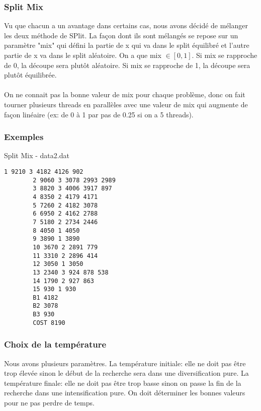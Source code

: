 \documentclass{beamer}
\begin{document}
\begin{frame}
    \frametitle{Split Mix}
    Vu que chacun a un avantage dans certains cas, nous avons décidé de mélanger les deux méthode de SPlit. La façon dont ils sont mélangés se repose sur un paramètre "mix" qui défini la partie de x qui va dans le split équilibré et l'autre partie de x va dans le split aléatoire.
    On a que mix $\in [0,1]$. Si mix se rapproche de 0, la découpe sera plutôt aléatoire. Si mix se rapproche de 1, la découpe sera plutôt équilibrée. \\~\\

    On ne connait pas la bonne valeur de mix pour chaque problème, donc on fait tourner plusieurs threads en parallèles avec une valeur de mix qui augmente de façon linéaire (ex: de 0 à 1 par pas de 0.25 si on a 5 threads).
\end{frame}

\begin{frame}[fragile]
    \frametitle{Exemples}
    \begin{exampleblock}{Split Mix - data2.dat}
        \begin{lstlisting}[basicstyle=\tiny]
        1 9210 3 4182 4126 902 
        2 9060 3 3078 2993 2989 
        3 8820 3 4006 3917 897 
        4 8350 2 4179 4171 
        5 7260 2 4182 3078 
        6 6950 2 4162 2788 
        7 5180 2 2734 2446 
        8 4050 1 4050 
        9 3890 1 3890 
        10 3670 2 2891 779 
        11 3310 2 2896 414 
        12 3050 1 3050 
        13 2340 3 924 878 538 
        14 1790 2 927 863 
        15 930 1 930 
        B1 4182
        B2 3078
        B3 930
        COST 8190
        \end{lstlisting}
    \end{exampleblock}
\end{frame}

\begin{frame}
    \frametitle{Choix de la température}
    Nous avons plusieurs paramètres.
    La température initiale: elle ne doit pas être trop élevée sinon le début de la recherche sera dans une diversification pure.
    La température finale: elle ne doit pas être trop basse sinon on passe la fin de la recherche dans une intensification pure.
    On doit déterminer les bonnes valeurs pour ne pas perdre de temps.
\end{frame}
\end{document}
